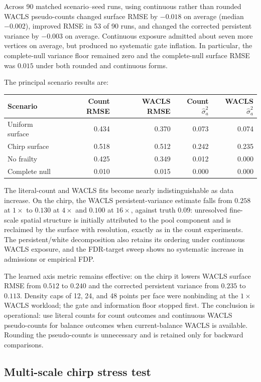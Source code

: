 \documentclass[11pt]{article}
\begin{document}
Across 90 matched scenario--seed runs, using continuous rather than rounded
WACLS pseudo-counts changed surface RMSE by $-0.018$ on average (median
$-0.002$), improved RMSE in 53 of 90 runs, and changed the corrected persistent
variance by $-0.003$ on average.  Continuous exposure admitted about seven more
vertices on average, but produced no systematic gate inflation.  In particular,
the complete-null variance floor remained zero and the complete-null surface
RMSE was $0.015$ under both rounded and continuous forms.

The principal scenario results are:
\begin{center}
\begin{tabular}{@{}lrrrr@{}}
\toprule
Scenario & Count RMSE & WACLS RMSE & Count $\hat\sigma_a^2$ & WACLS $\hat\sigma_a^2$\\
\midrule
Uniform surface & 0.434 & 0.370 & 0.073 & 0.074\\
Chirp surface & 0.518 & 0.512 & 0.242 & 0.235\\
No frailty & 0.425 & 0.349 & 0.012 & 0.000\\
Complete null & 0.010 & 0.015 & 0.000 & 0.000\\
\bottomrule
\end{tabular}
\end{center}
The literal-count and WACLS fits become nearly indistinguishable as data
increase.  On the chirp, the WACLS persistent-variance estimate falls from
$0.258$ at $1\times$ to $0.130$ at $4\times$ and $0.100$ at $16\times$, against
truth $0.09$: unresolved fine-scale spatial structure is initially attributed
to the pool component and is reclaimed by the surface with resolution, exactly
as in the count experiments.  The persistent/white decomposition also retains
its ordering under continuous WACLS exposure, and the FDR-target sweep shows no
systematic increase in admissions or empirical FDP.

The learned axis metric remains effective: on the chirp it lowers WACLS surface
RMSE from $0.512$ to $0.240$ and the corrected persistent variance from $0.235$
to $0.113$.  Density caps of 12, 24, and 48 points per face were nonbinding at
the $1\times$ WACLS workload; the gate and information floor stopped first.
The conclusion is operational: use literal counts for count outcomes and
continuous WACLS pseudo-counts for balance outcomes when current-balance WACLS
is available.  Rounding the pseudo-counts is unnecessary and is retained only
for backward comparisons.

\subsection{Multi-scale chirp stress test}\label{sec:chirp}
\end{document}
